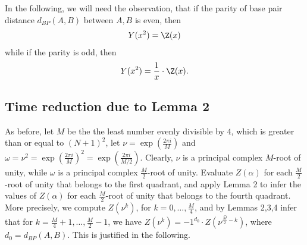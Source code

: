In the following, we will need the observation, that if the parity of
base pair distance $d_{BP}(A,B)$ between $A,B$ is
even, then
\begin{eqnarray}
\label{eq:evenY}
Y(x^2) = \Z(x)
\end{eqnarray}
while if the parity is odd,
then
\begin{eqnarray}
\label{eq:oddY}
Y(x^2) = \frac{1}{x} \cdot \Z(x).
\end{eqnarray}

\subsection{Time reduction due to Lemma 2}
As before, let $M$ be the the least number evenly divisible by $4$, which is
greater than or equal to $(N+1)^2$, let $\nu = \exp(\frac{2 \pi i}{M})$
and $\omega=\nu^2 = \exp(\frac{2 \pi i}{M})^2 =
\exp(\frac{2 \pi i}{M/2})$. Clearly, $\nu$ is a principal complex
$M$-root of unity, while $\omega$ is a principal complex $\frac{M}{2}$-root
of unity. Evaluate $Z(\alpha)$ for each $\frac{M}{2}$-root of unity
that belongs to the first quadrant, and apply Lemma 2 to infer the values
of $Z(\alpha)$ for each $\frac{M}{2}$-root of unity that belongs to the
fourth quadrant. More precisely,
we compute $Z(\nu^k)$, for $k=0,\ldots,\frac{M}{4}$, and by Lemmas 2,3,4 infer
that for $k=\frac{M}{4}+1,\ldots,\frac{M}{2}-1$, we have
$Z(\nu^{k})= -1^{d_0} \cdot \overline{Z(\nu^{\frac{M}{2}-k})}$, where
$d_0 = d_{BP}(A,B)$. This is justified in the following.

